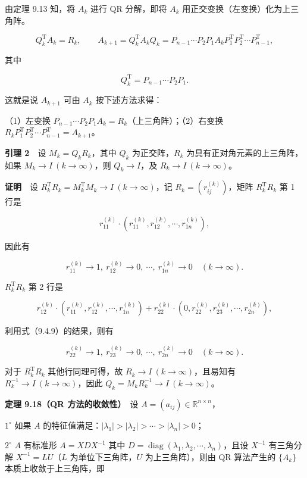 \documentclass[
  10pt,
  fontset=fandol]{ctexart}
\begin{document}
由定理 9.13 知，将 \(A_k\) 进行 QR 分解，即将 \(A_k\) 用正交变换（左变换）化为上三角阵。

\[
Q_k^{\mathrm T}A_k=R_k,\qquad
A_{k+1}=Q_k^{\mathrm T}A_kQ_k=P_{n-1}\cdots P_2P_1A_kP_1^{\mathrm T}P_2^{\mathrm T}\cdots P_{n-1}^{\mathrm T},
\]

其中

\[
Q_k^{\mathrm T}=P_{n-1}\cdots P_2P_1.
\]

这就是说 \(A_{k+1}\) 可由 \(A_k\) 按下述方法求得：

（1）左变换 \(P_{n-1}\cdots P_2P_1A_k=R_k\)（上三角阵）；（2）右变换 \(R_kP_1^{\mathrm T}P_2^{\mathrm T}\cdots P_{n-1}^{\mathrm T}=A_{k+1}\)。

\textbf{引理 2}　设 \(M_k=Q_kR_k\)，其中 \(Q_k\) 为正交阵，\(R_k\) 为具有正对角元素的上三角阵，如果 \(M_k\to I\ (k\to\infty)\)，则 \(Q_k\to I\)，及 \(R_k\to I\ (k\to\infty)\)。

\textbf{证明}　设 \(R_k^{\mathrm T}R_k=M_k^{\mathrm T}M_k\to I\ (k\to\infty)\)，记 \(R_k=(r_{ij}^{(k)})\)，矩阵 \(R_k^{\mathrm T}R_k\) 第 1 行是

\[
r_{11}^{(k)}\cdot(r_{11}^{(k)},r_{12}^{(k)},\cdots,r_{1n}^{(k)}),
\]

因此有

\[
r_{11}^{(k)}\to1,\ r_{12}^{(k)}\to0,\ \cdots,\ r_{1n}^{(k)}\to0\quad(k\to\infty).
\tag{9.4.9}
\]

\(R_k^{\mathrm T}R_k\) 第 2 行是

\[
r_{12}^{(k)}\cdot(r_{11}^{(k)},r_{12}^{(k)},\cdots,r_{1n}^{(k)})
+r_{22}^{(k)}\cdot(0,r_{22}^{(k)},r_{23}^{(k)},\cdots,r_{2n}^{(k)}),
\]

利用式（9.4.9）的结果，则有

\[
r_{22}^{(k)}\to1,\ r_{23}^{(k)}\to0,\ \cdots,\ r_{2n}^{(k)}\to0\quad(k\to\infty).
\tag{9.4.10}
\]

对于 \(R_k^{\mathrm T}R_k\) 其他行同理可得，故 \(R_k\to I\ (k\to\infty)\)，且易知有 \(R_k^{-1}\to I\ (k\to\infty)\)，因此 \(Q_k=M_kR_k^{-1}\to I\ (k\to\infty)\)。

\textbf{定理 9.18（QR 方法的收敛性）}　设 \(A=(a_{ij})\in\mathbb R^{n\times n}\)，

\(1^\circ\) 如果 \(A\) 的特征值满足：\(|\lambda_1|>|\lambda_2|>\cdots>|\lambda_n|>0\)；

\(2^\circ\) \(A\) 有标准形 \(A=XDX^{-1}\) 其中 \(D=\operatorname{diag}(\lambda_1,\lambda_2,\cdots,\lambda_n)\)，且设 \(X^{-1}\) 有三角分解 \(X^{-1}=LU\)（\(L\) 为单位下三角阵，\(U\) 为上三角阵），则由 QR 算法产生的 \(\{A_k\}\) 本质上收敛于上三角阵，即
\end{document}
